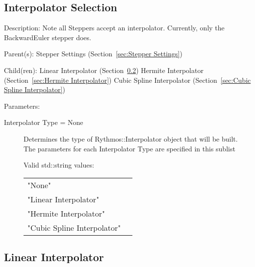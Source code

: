 \subsection{Interpolator Selection}
\label{sec:Interpolator Selection}

\begin{list}{}
  {\setlength{\leftmargin}{1.0in}
   \setlength{\labelwidth}{0.75in}
   \setlength{\labelsep}{0.125in}}
  \item[Description:]
    Note all Steppers accept an interpolator.  Currently, only the BackwardEuler
    stepper does.
  \item[Parent(s):]
    Stepper Settings (Section~\ref{sec:Stepper Settings})
  \item[Child(ren):]
    Linear Interpolator (Section~\ref{sec:Linear Interpolator})
      \newline 
    Hermite Interpolator (Section~\ref{sec:Hermite Interpolator})
      \newline 
    Cubic Spline Interpolator (Section~\ref{sec:Cubic Spline Interpolator})
  \item[Parameters:]
    \begin{description}
      \item[Interpolator Type = None] 
Determines the type of Rythmos::Interpolator object that will be built.
The parameters for each Interpolator Type are specified in this sublist

  Valid std::string values:

      \begin{tabular}{lp{}}
      "None" & \\ 
      "Linear Interpolator" & \\ 
      "Hermite Interpolator" & \\ 
      "Cubic Spline Interpolator" & \\ 
      \end{tabular}
\end{description}

\end{list}

\subsection{Linear Interpolator}
\label{sec:Linear Interpolator}

